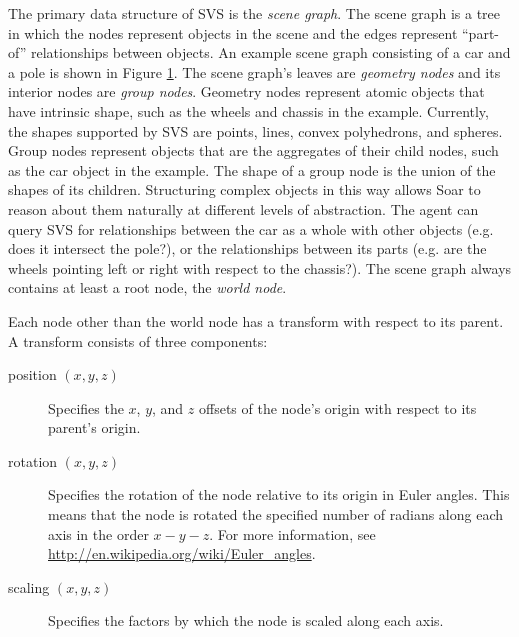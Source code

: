 The primary data structure of SVS is the \emph{scene graph}.
The scene graph is a tree in which the nodes represent objects in the scene and the edges represent ``part-of'' relationships between objects.
An example scene graph consisting of a car and a pole is shown in Figure \ref{fig:scene-graph}.
The scene graph's leaves are \emph{geometry nodes} and its interior nodes are \emph{group nodes}.
Geometry nodes represent atomic objects that have intrinsic shape, such as the wheels and chassis in the example.
Currently, the shapes supported by SVS are points, lines, convex polyhedrons, and spheres.
Group nodes represent objects that are the aggregates of their child nodes, such as the car object in the example.
The shape of a group node is the union of the shapes of its children.
Structuring complex objects in this way allows Soar to reason about them naturally at different levels of abstraction.
The agent can query SVS for relationships between the car as a whole with other objects (e.g. does it intersect the pole?), or the relationships between its parts (e.g. are the wheels pointing left or right with respect to the chassis?).
The scene graph always contains at least a root node, the \emph{world node}.

\begin{figure}
\label{fig:scene-graph}
\end{figure}

Each node other than the world node has a transform with respect to its parent.
A transform consists of three components:

\begin{description}
\item[position $(x,y,z)$]
Specifies the $x$, $y$, and $z$ offsets of the node's origin with respect to its parent's origin.

\item[rotation $(x,y,z)$]
Specifies the rotation of the node relative to its origin in Euler angles.
This means that the node is rotated the specified number of radians along each axis in the order $x-y-z$.
For more information, see \url{http://en.wikipedia.org/wiki/Euler_angles}.

\item[scaling $(x,y,z)$]
Specifies the factors by which the node is scaled along each axis.

\end{description}

